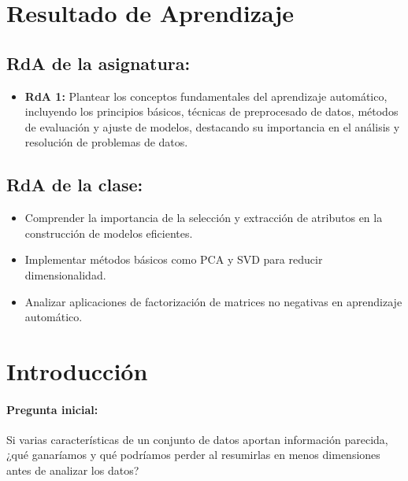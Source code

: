 \documentclass[a4,11pt]{aleph-notas}
\begin{document}
\encabezado

\section*{Resultado de Aprendizaje}

\subsection*{RdA de la asignatura:}
\begin{itemize}[leftmargin=*]
    \item \textbf{RdA 1:} Plantear los conceptos fundamentales del aprendizaje automático, incluyendo los principios básicos, técnicas de preprocesado de datos, métodos de evaluación y ajuste de modelos, destacando su importancia en el análisis y resolución de problemas de datos.
\end{itemize}

\subsection*{RdA de la clase:}
\begin{itemize}[leftmargin=*]
    \item Comprender la importancia de la selección y extracción de atributos en la construcción de modelos eficientes.
    \item Implementar métodos básicos como PCA y SVD para reducir dimensionalidad.
    \item Analizar aplicaciones de factorización de matrices no negativas en aprendizaje automático.
\end{itemize}

\section*{Introducción}

\paragraph{Pregunta inicial:} 
Si varias características de un conjunto de datos aportan información parecida, ¿qué ganaríamos y qué podríamos perder al resumirlas en menos dimensiones antes de analizar los datos?
\end{document}
